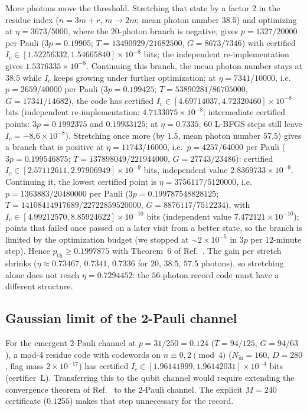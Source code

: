 \documentclass[aps,pra,reprint,superscriptaddress,nofootinbib,longbibliography,floatfix]{revtex4-2}
\theoremstyle{remark}
\newcommand{\Ic}{I_c}
\begin{document}
More photons move the threshold. Stretching that state by a factor 2 in the residue index ($n=3m+r$,
$m\to2m$; mean photon number $38.5$) and optimizing at $\eta=3673/5000$, where the 20-photon branch is
negative, gives $p=1327/20000$ per Pauli ($3p=0.19905$; $T=13490929/21682500$, $G=8673/7346$) with
certified $\Ic\in[1.52256332,1.54665840]\times10^{-8}$ bits; the independent re-implementation gives
$1.5376335\times10^{-8}$. Continuing this branch, the mean photon number stays at $38.5$ while $\Ic$
keeps growing under further optimization; at $\eta=7341/10000$, i.e.\ $p=2659/40000$ per Pauli
($3p=0.199425$; $T=53890281/86705000$, $G=17341/14682$), the code has certified
$\Ic\in[4.69714037,4.72320460]\times10^{-8}$ bits (independent re-implementation: $4.7133075\times10^{-8}$; intermediate certified points: $3p=0.1992375$ and
$0.19933125$; at $\eta=0.7335$, $60$ L-BFGS steps still leave $\Ic=-8.6\times10^{-8}$). Stretching once more (by $1.5$, mean photon number $57.5$) gives a branch that is positive at
$\eta=11743/16000$, i.e.\ $p=4257/64000$ per Pauli ($3p=0.199546875$; $T=137898049/221944000$,
$G=27743/23486$): certified $\Ic\in[2.57112611,2.97906949]\times10^{-9}$ bits, independent value
$2.8369733\times10^{-9}$. Continuing it, the lowest certified point is $\eta=3756117/5120000$, i.e.\
$p=1363883/20480000$ per Pauli ($3p=0.199787548828125$; $T=14108414917689/22722859520000$,
$G=8876117/7512234$), with $\Ic\in[4.99212570,8.85924622]\times10^{-10}$ bits (independent value
$7.472121\times10^{-10}$); points that failed once
passed on a later visit from a better state, so the branch is limited by the optimization budget (we
stopped at $\sim2\times10^{-5}$ in $3p$ per 12-minute step). Hence $p_{\mathrm{th}}\ge0.1997875$ with Theorem~6 of
Ref.~\cite{ahmed2026choir}. The gain per stretch shrinks ($\eta\approx0.73467$, $0.7341$, $0.7336$ for
$20$, $38.5$, $57.5$ photons), so stretching alone does not reach $\eta=0.7294452$: the $56$-photon record
code must have a different structure.

\subsection{Gaussian limit of the 2-Pauli channel}
For the emergent 2-Pauli channel at $p=31/250=0.124$ ($T=94/125$, $G=94/63$), a mod-4 residue code with
codewords on $n\equiv0,2\pmod4$ ($N_{\mathrm{in}}=160$, $D=280$, flag mass $2\times10^{-17}$) has
certified $\Ic\in[1.96141999,1.96142031]\times10^{-4}$ bits (certifier~L). Transferring this to the qubit
channel would require extending the convergence theorem of Ref.~\cite{ahmed2026choir} to the 2-Pauli
channel. The explicit $M=240$ certificate ($0.1255$) makes that step unnecessary for the record.
\end{document}
